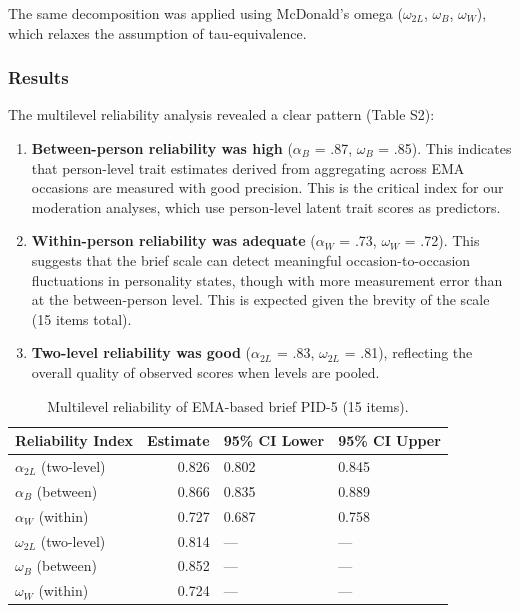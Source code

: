 \documentclass[
  english,
  man,floatsintext]{apa6}
\begin{document}
The same decomposition was applied using McDonald's omega (\(\omega_{2L}\), \(\omega_B\), \(\omega_W\)), which relaxes the assumption of tau-equivalence.

\subsubsection{Results}\label{results-1}

The multilevel reliability analysis revealed a clear pattern (Table S2):

\begin{enumerate}
\def\labelenumi{\arabic{enumi}.}
\item
  \textbf{Between-person reliability was high} (\(\alpha_B\) = .87, \(\omega_B\) = .85). This indicates that person-level trait estimates derived from aggregating across EMA occasions are measured with good precision. This is the critical index for our moderation analyses, which use person-level latent trait scores as predictors.
\item
  \textbf{Within-person reliability was adequate} (\(\alpha_W\) = .73, \(\omega_W\) = .72). This suggests that the brief scale can detect meaningful occasion-to-occasion fluctuations in personality states, though with more measurement error than at the between-person level. This is expected given the brevity of the scale (15 items total).
\item
  \textbf{Two-level reliability was good} (\(\alpha_{2L}\) = .83, \(\omega_{2L}\) = .81), reflecting the overall quality of observed scores when levels are pooled.
\end{enumerate}

\begin{table}

\caption{\label{tab:table-s2-ema-reliability}Multilevel reliability of EMA-based brief PID-5 (15 items).}
\centering
\begin{tabular}[t]{lrll}
\toprule
Reliability Index & Estimate & 95\% CI Lower & 95\% CI Upper\\
\midrule
$\alpha_{2L}$ (two-level) & 0.826 & 0.802 & 0.845\\
$\alpha_B$ (between) & 0.866 & 0.835 & 0.889\\
$\alpha_W$ (within) & 0.727 & 0.687 & 0.758\\
$\omega_{2L}$ (two-level) & 0.814 & --- & ---\\
$\omega_B$ (between) & 0.852 & --- & ---\\
\addlinespace
$\omega_W$ (within) & 0.724 & --- & ---\\
\bottomrule
\end{tabular}
\end{table}
\end{document}
